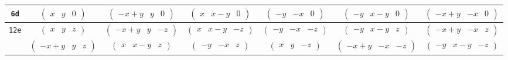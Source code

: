 \documentclass[fleqn,9pt,landscape]{jsarticle}
\begin{document}
\begin{center}
\begin{longtable}{ccccccc}
{\tt 6d} & $ \begin{pmatrix} x & y & 0 \end{pmatrix} $ & $ \begin{pmatrix} - x + y & y & 0 \end{pmatrix} $ & $ \begin{pmatrix} x & x - y & 0 \end{pmatrix} $ & $ \begin{pmatrix} - y & - x & 0 \end{pmatrix} $ & $ \begin{pmatrix} - y & x - y & 0 \end{pmatrix} $ & $ \begin{pmatrix} - x + y & - x & 0 \end{pmatrix} $ \\ \hline
{\tt 12e} & $ \begin{pmatrix} x & y & z \end{pmatrix} $ & $ \begin{pmatrix} - x + y & y & - z \end{pmatrix} $ & $ \begin{pmatrix} x & x - y & - z \end{pmatrix} $ & $ \begin{pmatrix} - y & - x & - z \end{pmatrix} $ & $ \begin{pmatrix} - y & x - y & z \end{pmatrix} $ & $ \begin{pmatrix} - x + y & - x & z \end{pmatrix} $ \\
& $ \begin{pmatrix} - x + y & y & z \end{pmatrix} $ & $ \begin{pmatrix} x & x - y & z \end{pmatrix} $ & $ \begin{pmatrix} - y & - x & z \end{pmatrix} $ & $ \begin{pmatrix} x & y & - z \end{pmatrix} $ & $ \begin{pmatrix} - x + y & - x & - z \end{pmatrix} $ & $ \begin{pmatrix} - y & x - y & - z \end{pmatrix} $ \\
\end{longtable}
\end{center}
\end{document}
